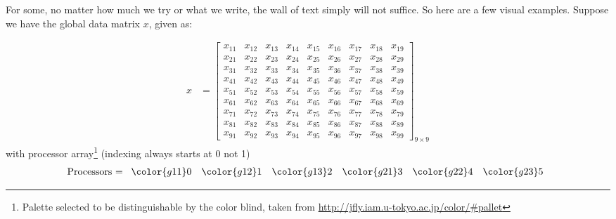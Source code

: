 For some, no matter how much we try or what we write, the wall of text simply will not suffice.  So here are a few visual examples.  Suppose we have the global data matrix $x$, given as:

\begin{align*}
x &= \left[
      \begin{array}{lllllllll}
      x_{11} & x_{12} & x_{13} & x_{14} & x_{15} & x_{16} & x_{17} & x	_{18} & x_{19}\\
      x_{21} & x_{22} & x_{23} & x_{24} & x_{25} & x_{26} & x_{27} & x	_{28} & x_{29}\\
      x_{31} & x_{32} & x_{33} & x_{34} & x_{35} & x_{36} & x_{37} & x	_{38} & x_{39}\\
      x_{41} & x_{42} & x_{43} & x_{44} & x_{45} & x_{46} & x_{47} & x	_{48} & x_{49}\\
      x_{51} & x_{52} & x_{53} & x_{54} & x_{55} & x_{56} & x_{57} & x	_{58} & x_{59}\\
      x_{61} & x_{62} & x_{63} & x_{64} & x_{65} & x_{66} & x_{67} & x	_{68} & x_{69}\\
      x_{71} & x_{72} & x_{73} & x_{74} & x_{75} & x_{76} & x_{77} & x	_{78} & x_{79}\\
      x_{81} & x_{82} & x_{83} & x_{84} & x_{85} & x_{86} & x_{87} & x	_{88} & x_{89}\\
      x_{91} & x_{92} & x_{93} & x_{94} & x_{95} & x_{96} & x_{97} & x	_{98} & x_{99}
      \end{array}
\right]_{9\times 9}
\end{align*}
with processor array\footnote{Palette selected to be distinguishable by the color blind, taken from \url{http://jfly.iam.u-tokyo.ac.jp/color/\#pallet}} (indexing always starts at 0 not 1)
\begin{align*}
\text{Processors = }
      \begin{array}{llllll}
      \color{g11}0 & \color{g12}1 & \color{g13}2 & \color{g21}3 & \color{g22}4 & \color{g23}5
      \end{array}
\end{align*}

